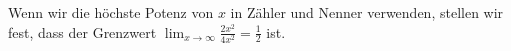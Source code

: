 Wenn wir die höchste Potenz von $x$ in Zähler und Nenner verwenden, stellen wir fest, dass der Grenzwert $\lim_{x \to \infty} \frac{2x^2}{4x^2} = \frac{1}{2}$ ist.
